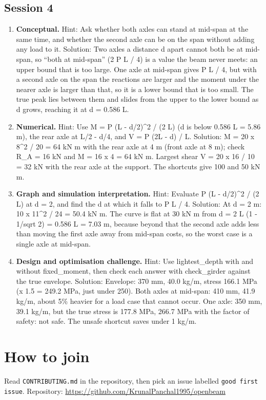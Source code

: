 \documentclass[11pt,a4paper]{article}
\begin{document}
\subsection*{Session 4}
\begin{enumerate}[nosep]
\item \textbf{Conceptual.} Hint: Ask whether both axles can stand at mid-span at the same time, and whether the second axle can be on the span without adding any load to it. Solution: Two axles a distance d apart cannot both be at mid-span, so ``both at mid-span'' (2 P L / 4) is a value the beam never meets: an upper bound that is too large. One axle at mid-span gives P L / 4, but with a second axle on the span the reactions are larger and the moment under the nearer axle is larger than that, so it is a lower bound that is too small. The true peak lies between them and slides from the upper to the lower bound as d grows, reaching it at d = 0.586 L.
\item \textbf{Numerical.} Hint: Use M = P (L - d/2)\textasciicircum{}2 / (2 L) (d is below 0.586 L = 5.86 m), the rear axle at L/2 - d/4, and V = P (2L - d) / L. Solution: M = 20 x 8\textasciicircum{}2 / 20 = 64 kN m with the rear axle at 4 m (front axle at 8 m); check R\_A = 16 kN and M = 16 x 4 = 64 kN m. Largest shear V = 20 x 16 / 10 = 32 kN with the rear axle at the support. The shortcuts give 100 and 50 kN m.
\item \textbf{Graph and simulation interpretation.} Hint: Evaluate P (L - d/2)\textasciicircum{}2 / (2 L) at d = 2, and find the d at which it falls to P L / 4. Solution: At d = 2 m: 10 x 11\textasciicircum{}2 / 24 = 50.4 kN m. The curve is flat at 30 kN m from d = 2 L (1 - 1/sqrt 2) = 0.586 L = 7.03 m, because beyond that the second axle adds less than moving the first axle away from mid-span costs, so the worst case is a single axle at mid-span.
\item \textbf{Design and optimisation challenge.} Hint: Use lightest\_depth with and without fixed\_moment, then check each answer with check\_girder against the true envelope. Solution: Envelope: 370 mm, 40.0 kg/m, stress 166.1 MPa (x 1.5 = 249.2 MPa, just under 250). Both axles at mid-span: 410 mm, 41.9 kg/m, about 5\% heavier for a load case that cannot occur. One axle: 350 mm, 39.1 kg/m, but the true stress is 177.8 MPa, 266.7 MPa with the factor of safety: not safe. The unsafe shortcut saves under 1 kg/m.
\end{enumerate}

\section{How to join}
Read \texttt{CONTRIBUTING.md} in the repository, then pick an issue labelled \texttt{good first issue}. Repository: \url{https://github.com/KrunalPanchal1995/openbeam}
\end{document}

